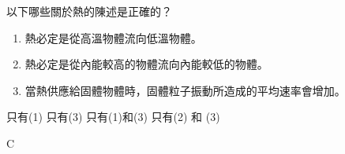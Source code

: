 {
    以下哪些關於熱的陳述是正確的？
    \medskip
    \begin{enumerate}[label=\sd]
        \item 熱必定是從高溫物體流向低溫物體。
        \item 熱必定是從內能較高的物體流向內能較低的物體。
        \item 當熱供應給固體物體時，固體粒子振動所造成的平均速率會增加。
    \end{enumerate}\medskip
    \begin{choices}
        \choice 只有(1)
        \choice 只有(3)
        \CorrectChoice 只有(1)和(3)
        \choice 只有(2) 和 (3)
    \end{choices}
}{\mckey C}

